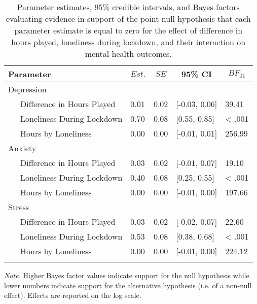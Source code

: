\documentclass[
  english,
  man,floatsintext]{apa6}
\begin{document}
\begin{table}[!htbp]

\begin{center}
\begin{threeparttable}

\caption{\label{tab:study-one-mh-moderation}Parameter estimates, 95\% credible intervals, and Bayes factors evaluating evidence in support of the point null hypothesis that each parameter estimate is equal to zero for the effect of difference in hours played, loneliness during lockdown, and their interaction on mental health outcomes.}

\begin{tabular}{lllll}
\toprule
Parameter & \multicolumn{1}{c}{$Est.$} & \multicolumn{1}{c}{$SE$} & \multicolumn{1}{c}{95\% CI} & \multicolumn{1}{c}{$BF_{01}$}\\
\midrule
Depression &  &  &  & \\
\ \ \ Difference in Hours Played & 0.01 & 0.02 & {}[-0.03, 0.06] & 39.41\\
\ \ \ Loneliness During Lockdown & 0.70 & 0.08 & {}[0.55, 0.85] & < .001\\
\ \ \ Hours by Loneliness & 0.00 & 0.00 & {}[-0.01, 0.01] & 256.99\\
Anxiety &  &  &  & \\
\ \ \ Difference in Hours Played & 0.03 & 0.02 & {}[-0.01, 0.07] & 19.10\\
\ \ \ Loneliness During Lockdown & 0.40 & 0.08 & {}[0.25, 0.55] & < .001\\
\ \ \ Hours by Loneliness & 0.00 & 0.00 & {}[-0.01, 0.00] & 197.66\\
Stress &  &  &  & \\
\ \ \ Difference in Hours Played & 0.03 & 0.02 & {}[-0.02, 0.07] & 22.60\\
\ \ \ Loneliness During Lockdown & 0.53 & 0.08 & {}[0.38, 0.68] & < .001\\
\ \ \ Hours by Loneliness & 0.00 & 0.00 & {}[-0.01, 0.00] & 224.12\\
\bottomrule
\addlinespace
\end{tabular}

\begin{tablenotes}[para]
\normalsize{\textit{Note.} Higher Bayes factor values indicate support for the null hypothesis while lower numbers indicate support for the alternative hypothesis (i.e. of a non-null effect). Effects are reported on the log scale.}
\end{tablenotes}

\end{threeparttable}
\end{center}

\end{table}
\end{document}
